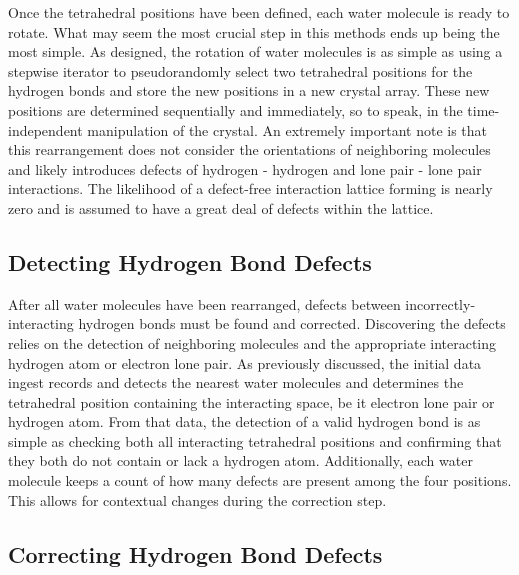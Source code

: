 Once the tetrahedral positions have been defined, each water molecule is ready to rotate.
What may seem the most crucial step in this methods ends up being the most simple.
As designed, the rotation of water molecules is as simple as using a stepwise iterator to pseudorandomly select two tetrahedral positions for the hydrogen bonds and store the new positions in a new crystal array.
These new positions are determined sequentially and immediately, so to speak, in the time-independent manipulation of the  crystal.
An extremely important note is that this rearrangement does not consider the orientations of neighboring molecules and likely introduces defects of hydrogen - hydrogen and lone pair - lone pair interactions.
The likelihood of a defect-free interaction lattice forming is nearly zero and is assumed to have a great deal of defects within the lattice. 


\subsection{Detecting Hydrogen Bond Defects}

After all water molecules have been rearranged, defects between incorrectly-interacting hydrogen bonds must be found and corrected.
Discovering the defects relies on the detection of neighboring molecules and the appropriate interacting hydrogen atom or electron lone pair. 
As previously discussed, the initial data ingest records and detects the nearest water molecules and determines the tetrahedral position containing the interacting space, be it electron lone pair or hydrogen atom. 
From that data, the detection of a valid hydrogen bond is as simple as checking both all interacting tetrahedral positions and confirming that they both do not contain or lack a hydrogen atom.
Additionally, each water molecule keeps a count of how many defects are present among the four positions. 
This allows for contextual changes during the correction step.


\subsection{Correcting Hydrogen Bond Defects}


